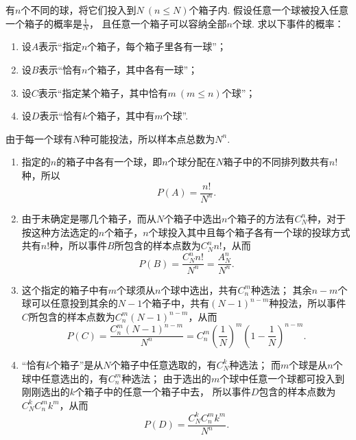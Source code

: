 \begin{example}[投球问题]\label{example:概率论基础.古典概型.投球问题}
有\(n\)个不同的球，将它们投入到\(N\ (n \leq N)\)个箱子内.
假设任意一个球被投入任意一个箱子的概率是\(\frac{1}{N}\)，
且任意一个箱子可以容纳全部\(n\)个球.
求以下事件的概率：
\begin{enumerate}
\item 设\(A\)表示“指定\(n\)个箱子，每个箱子里各有一球”；
\item 设\(B\)表示“恰有\(n\)个箱子，其中各有一球”；
\item 设\(C\)表示“指定某个箱子，其中恰有\(m\ (m \leq n)\)个球”；
\item 设\(D\)表示“恰有\(k\)个箱子，其中有\(m\)个球”.
\end{enumerate}
\begin{solution}
由于每一个球有\(N\)种可能投法，所以样本点总数为\(N^n\).
\begin{enumerate}
\item
指定的\(n\)的箱子中各有一个球，即\(n\)个球分配在\(N\)箱子中的不同排列数共有\(n!\)种，所以\[
P(A) = \frac{n!}{N^n}.
\]

\item
由于未确定是哪几个箱子，而从\(N\)个箱子中选出\(n\)个箱子的方法有\(C_N^n\)种，对于按这种方法选定的\(n\)个箱子，\(n\)个球投入其中且每个箱子各有一个球的投球方式共有\(n!\)种，所以事件\(B\)所包含的样本点数为\(C_N^n n!\)，从而\[
P(B) = \frac{C_N^n n!}{N^n} = \frac{A_N^n}{N^n}.
\]

\item
这个指定的箱子中有\(m\)个球须从\(n\)个球中选出，共有\(C_n^m\)种选法；
其余\(n-m\)个球可以任意投到其余的\(N-1\)个箱子中，共有\((N-1)^{n-m}\)种投法，所以事件\(C\)所包含的样本点数为\(C_n^m (N-1)^{n-m}\)，从而\[
P(C) = \frac{C_n^m (N-1)^{n-m}}{N^n}
= C_n^m \left(\frac{1}{N}\right)^m \left(1-\frac{1}{N}\right)^{n-m}.
\]

\item
“恰有\(k\)个箱子”是从\(N\)个箱子中任意选取的，有\(C_N^k\)种选法；
而\(m\)个球是从\(n\)个球中任意选出的，有\(C_n^m\)种选法；
由于选出的\(m\)个球中任意一个球都可投入到刚刚选出的\(k\)个箱子中的任意一个箱子中去，
所以事件\(D\)包含的样本点数为\(C_N^k C_n^m k^m\)，从而\[
P(D) = \frac{C_N^k C_n^m k^m}{N^n}.
\]
\end{enumerate}
\end{solution}
\end{example}

